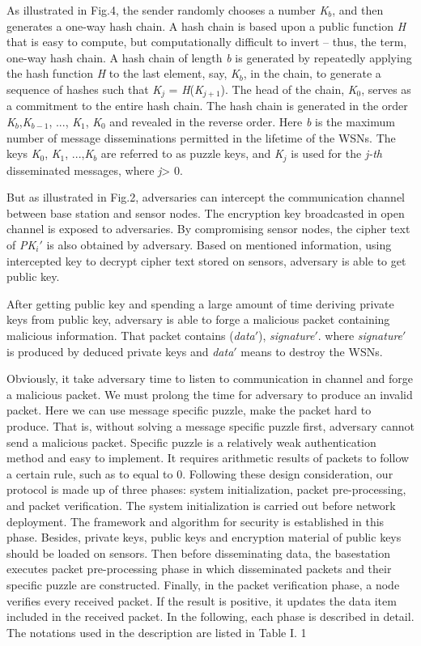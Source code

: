 \documentclass{sig-alternate-05-2015}
\begin{document}
As illustrated in Fig.4, the sender randomly chooses a number \emph{K$_b$}, and then generates a one-way hash chain. A hash chain is based upon a public function \emph{H} that is easy to compute, but computationally difficult to invert -- thus, the term, one-way hash chain. A hash chain of length \emph{b} is generated by repeatedly applying the hash function \emph{H} to the last element, say, \emph{K$_b$}, in the chain, to generate a sequence of hashes such that \emph{K$_j$} = \emph{H}(\emph{K$_{j+1}$}). The head of the chain, \emph{K$_0$}, serves as a commitment to the entire hash chain. The hash chain is generated in the order \emph{K$_b$},\emph{K$_{b-1}$}, ..., \emph{K$_1$}, \emph{K$_0$} and revealed in the reverse order. Here \emph{b} is the maximum number of message disseminations permitted in the lifetime of the WSNs. The keys \emph{K$_0$}, \emph{K$_1$}, ...,\emph{K$_b$} are referred to as puzzle keys, and \emph{K$_j$} is used for the \emph{j-th} disseminated messages, where \emph{j}> 0.


But as illustrated in Fig.2, adversaries can intercept the communication channel between base station and sensor nodes. The encryption key broadcasted in open channel is exposed to adversaries. By compromising sensor nodes, the cipher text of \emph{PK$_i '$} is also obtained by adversary. Based on mentioned information, using intercepted key to decrypt cipher text stored on sensors, adversary is able to get public key.

After getting public key and spending a large amount of time deriving private keys from public key, adversary is able to forge a malicious packet containing malicious information. That packet contains (\emph{data}$'$), \emph{signature}$'$. where \emph{signature}$'$ is produced by deduced private keys and \emph{data}$'$ means to destroy the WSNs.
		
	Obviously, it take adversary time to listen to communication in channel and forge a malicious packet. 
	We must prolong the time for adversary to produce an invalid packet. Here we can use message specific puzzle, make the packet hard to produce. That is, without solving a message specific puzzle first, adversary cannot send a malicious packet.
	Specific puzzle is a relatively weak authentication method and easy to implement. It requires arithmetic results of packets to follow a certain rule, such as to equal to 0.
	Following these design consideration, our protocol is made up of three phases: system initialization, packet pre-processing, and packet verification. The system initialization is carried out before network deployment. The framework and algorithm for security is established in this phase. Besides, private keys, public keys and encryption material of public keys should be loaded on sensors. Then before disseminating data, the basestation executes packet pre-processing phase in which disseminated packets and their specific puzzle are constructed. Finally, in the packet verification phase, a node verifies every received packet. If the result is positive, it updates the data item included in the received packet. In the following, each phase is described in detail. The notations used in the description are listed in Table I.  1
\end{document}
